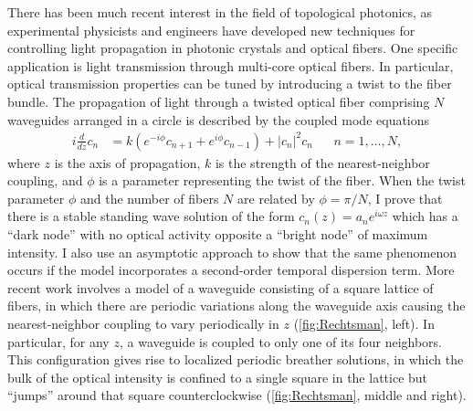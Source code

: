 \documentclass[11pt,reqno,oneside]{article}
\theoremstyle{definition}
\theoremstyle{remark}
\begin{document}
There has been much recent interest in the field of topological photonics, as experimental physicists and engineers have developed new techniques for controlling light propagation in photonic crystals and optical fibers. One specific application is light transmission through multi-core optical fibers. In particular, optical transmission properties can be tuned by introducing a twist to the fiber bundle. The propagation of light through a twisted optical fiber comprising $N$ waveguides arranged in a circle is described by the coupled mode equations
\begin{align*}
i \frac{d}{dz} c_n &= k \left(e^{-i\phi}c_{n+1} + e^{i\phi}c_{n-1}\right) + |c_n|^2 c_n &&  n = 1, \dots, N,
\end{align*}
where $z$ is the axis of propagation, $k$ is the strength of the nearest-neighbor coupling, and $\phi$ is a parameter representing the twist of the fiber. When the twist parameter $\phi$ and the number of fibers $N$ are related by $\phi = \pi/N$, I prove that there is a stable standing wave solution of the form $c_n(z) = a_n e^{i \omega z}$ which has a ``dark node'' with no optical activity opposite a ``bright node'' of maximum intensity. I also use an asymptotic approach to show that the same phenomenon occurs if the model incorporates a second-order temporal dispersion term. More recent work involves a model of a waveguide consisting of a square lattice of fibers, in which there are periodic variations along the waveguide axis causing the nearest-neighbor coupling to vary periodically in $z$ (\cref{fig:Rechtsman}, left). In particular, for any $z$, a waveguide is coupled to only one of its four neighbors. This configuration gives rise to localized periodic breather solutions, in which the bulk of the optical intensity is confined to a single square in the lattice but ``jumps'' around that square counterclockwise (\cref{fig:Rechtsman}, middle and right). 
\end{document}
